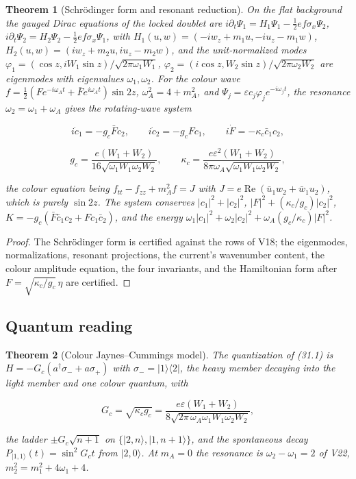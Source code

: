 \documentclass[11pt]{article}
\newtheorem{theorem}{Theorem}[section]
\theoremstyle{remark}
\begin{document}
\begin{theorem}[Schr\"odinger form and resonant reduction]
\label{thm:v20v28-threewave}
On the flat background the gauged Dirac equations of the locked
doublet are \(i\partial_t\Psi_1=H_1\Psi_1-\tfrac12ef\sigma_x\Psi_2\),
\(i\partial_t\Psi_2=H_2\Psi_2-\tfrac12ef\sigma_x\Psi_1\), with
\(H_1(u,w)=(-iw_z+m_1u,-iu_z-m_1w)\),
\(H_2(u,w)=(iw_z+m_2u,iu_z-m_2w)\), and the unit-normalized modes
\(\varphi_1=(\cos z,iW_1\sin z)/\sqrt{2\pi\omega_1W_1}\),
\(\varphi_2=(i\cos z,W_2\sin z)/\sqrt{2\pi\omega_2W_2}\) are eigenmodes
with eigenvalues \(\omega_1,\omega_2\).  For the colour wave
\(f=\tfrac12(Fe^{-i\omega_At}+\bar Fe^{i\omega_At})\sin2z\),
\(\omega_A^2=4+m_A^2\), and \(\Psi_j=\varepsilon c_j\varphi_je^{-i\omega_jt}\),
the resonance \(\omega_2=\omega_1+\omega_A\) gives the rotating-wave system

\[
 i\dot c_1=-g_c\bar Fc_2,\qquad i\dot c_2=-g_cFc_1,\qquad i\dot F=-\kappa_c\bar c_1c_2,
                                                                    \tag{31.1}
\]

\[
 g_c=\frac{e(W_1+W_2)}{16\sqrt{\omega_1W_1\omega_2W_2}},\qquad
 \kappa_c=\frac{e\varepsilon^2(W_1+W_2)}{8\pi\omega_A\sqrt{\omega_1W_1\omega_2W_2}},
                                                                    \tag{31.2}
\]

the colour equation being \(f_{tt}-f_{zz}+m_A^2f=J\) with
\(J=e\operatorname{Re}(\bar u_1w_2+\bar w_1u_2)\), which is purely
\(\sin2z\).  The system conserves \(|c_1|^2+|c_2|^2\),
\(|F|^2+(\kappa_c/g_c)|c_2|^2\), \(K=-g_c(\bar F\bar c_1c_2+F c_1\bar c_2)\),
and the energy \(\omega_1|c_1|^2+\omega_2|c_2|^2+\omega_A(g_c/\kappa_c)|F|^2\).
\end{theorem}

\begin{proof}
The Schr\"odinger form is certified against the rows of V18; the
eigenmodes, normalizations, resonant projections, the current's
wavenumber content, the colour amplitude equation, the four
invariants, and the Hamiltonian form after \(F=\sqrt{\kappa_c/g_c}\,\eta\)
are certified.
\end{proof}

\subsection{Quantum reading}

\begin{theorem}[Colour Jaynes--Cummings model]
\label{thm:v20v28-jc}
The quantization of (31.1) is \(H=-G_c(a^\dagger\sigma_-+a\sigma_+)\)
with \(\sigma_-=|1\rangle\langle2|\), the heavy member decaying into the
light member and one colour quantum, with

\[
 G_c=\sqrt{\kappa_cg_c}=\frac{e\varepsilon(W_1+W_2)}{8\sqrt{2\pi\,\omega_A\omega_1W_1\omega_2W_2}},
                                                                    \tag{31.3}
\]

the ladder \(\pm G_c\sqrt{n+1}\) on \(\{|2,n\rangle,|1,n+1\rangle\}\), and
the spontaneous decay \(P_{|1,1\rangle}(t)=\sin^2G_ct\) from
\(|2,0\rangle\).  At \(m_A=0\) the resonance is \(\omega_2-\omega_1=2\)
of V22, \(m_2^2=m_1^2+4\omega_1+4\).
\end{theorem}
\end{document}
